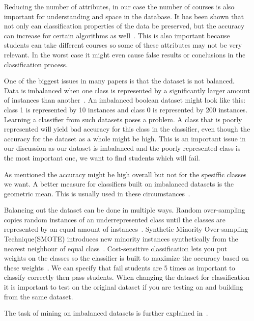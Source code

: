 \bigskip\noindent
Reducing the number of attributes, in our case the number of courses is also important for understanding and space in the database.
It has been shown that not only can classification properties of the data be preserved, but the accuracy can increase for certain algorithms as well~\cite{9}.
This is also important because students can take different courses so some of these attributes may not be very relevant. 
In the worst case it might even cause false results or conclusions in the classification process.

\bigskip\noindent
One of the biggest issues in many papers is that the dataset is not balanced. 
Data is imbalanced when one class is represented by a significantly larger amount of instances than another~\cite{10}. 
An imbalanced boolean dataset might look like this: class 1 is represented by 10 instances and class 0 is represented by 200 instances. 
Learning a classifier from such datasets poses a problem. 
A class that is poorly represented will yield bad accuracy for this class in the classifier, 
even though the accuracy for the dataset as a whole might be high. 
This is an important issue in our discussion as our dataset is imbalanced and the poorly represented class is the most important one, 
we want to find students which will fail.

\bigskip\noindent
As mentioned the accuracy might be high overall but not for the spesiffic classes we want.
A better measure for classifiers built on imbalanced datasets is the geometric mean. 
This is usually used in these circumstances~\cite{12}. 

\bigskip\noindent
Balancing out the dataset can be done in multiple ways. 
Random over-sampling copies random instances of an underrepresented class until the classes are represented by an equal amount of instances~\cite{12}. 
Synthetic Minority Over-sampling Technique(SMOTE) introduces new minority instances synthetically from the nearest neighbour of equal class~\cite{9}. 
Cost-sensitive classification lets you put weights on the classes so the classifier is built to maximize the accuracy based on these weights~\cite{9}. 
We can specify that fail students are 5 times as important to classify correctly then pass students. 
When changing the dataset for classification it is important to test on the original dataset if you are testing on and building from the same dataset.

\bigskip\noindent
The task of mining on imbalanced datasets is further explained in~\cite{10}.

